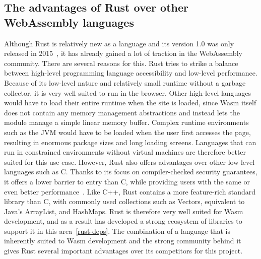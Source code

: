 \subsection{The advantages of Rust over other WebAssembly languages} \label{rust-vs-other-wasm}
Although Rust is relatively new as a language and its version 1.0 was only released in 2015~\cite{rustreleases}, it has already gained a lot of traction in the WebAssembly community.
There are several reasons for this. Rust tries to strike a balance between high-level programming language accessibility and low-level performance.
Because of its low-level nature and relatively small runtime without a garbage collector, it is very well suited to run in the browser. Other high-level languages would have to load their entire runtime when the site is loaded, since Wasm itself does not contain any memory management abstractions and instead lets the module manage a simple linear memory buffer.
Complex runtime environments such as the JVM would have to be loaded when the user first accesses the page, resulting in enormous package sizes and long loading screens.
Languages that can run in constrained environments without virtual machines are therefore better suited for this use case.
However, Rust also offers advantages over other low-level languages such as C. Thanks to its focus on compiler-checked security guarantees, it offers a lower barrier to entry than C, while providing users with the same or even better performance~\cite{medin2021performance}.
Like C++, Rust contains a more feature-rich standard library than C, with commonly used collections such as Vectors, equivalent to Java's ArrayList, and HashMaps.
Rust is therefore very well suited for Wasm development, and as a result has developed a strong ecosystem of libraries to support it in this area~\ref{rust-deps}.
The combination of a language that is inherently suited to Wasm development and the strong community behind it gives Rust several important advantages over its competitors for this project.


